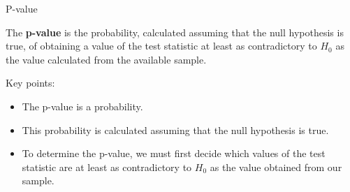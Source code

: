 \documentclass[
  ignorenonframetext,
]{beamer}
\providecommand{\tightlist}{%
  \setlength{\itemsep}{0pt}\setlength{\parskip}{0pt}}\usepackage{longtable,booktabs,array}
\begin{document}
\begin{frame}{P-value}
\protect\hypertarget{p-value-1}{}
\begin{tcolorbox}[enhanced jigsaw, left=2mm, breakable, bottomrule=.15mm, colframe=quarto-callout-important-color-frame, arc=.35mm, leftrule=.75mm, colbacktitle=quarto-callout-important-color!10!white, titlerule=0mm, opacityback=0, coltitle=black, opacitybacktitle=0.6, colback=white, toprule=.15mm, toptitle=1mm, bottomtitle=1mm, title=\textcolor{quarto-callout-important-color}{\faExclamation}\hspace{0.5em}{Definition}, rightrule=.15mm]

The \textbf{p-value} is the probability, calculated assuming that the
null hypothesis is true, of obtaining a value of the test statistic at
least as contradictory to \(H_{0}\) as the value calculated from the
available sample.

\end{tcolorbox}

Key points:

\begin{itemize}[<+->]
\tightlist
\item
  The p-value is a probability.
\item
  This probability is calculated assuming that the null hypothesis is
  true.
\item
  To determine the p-value, we must first decide which values of the
  test statistic are at least as contradictory to \(H_{0}\) as the value
  obtained from our sample.
\end{itemize}
\end{frame}
\end{document}

